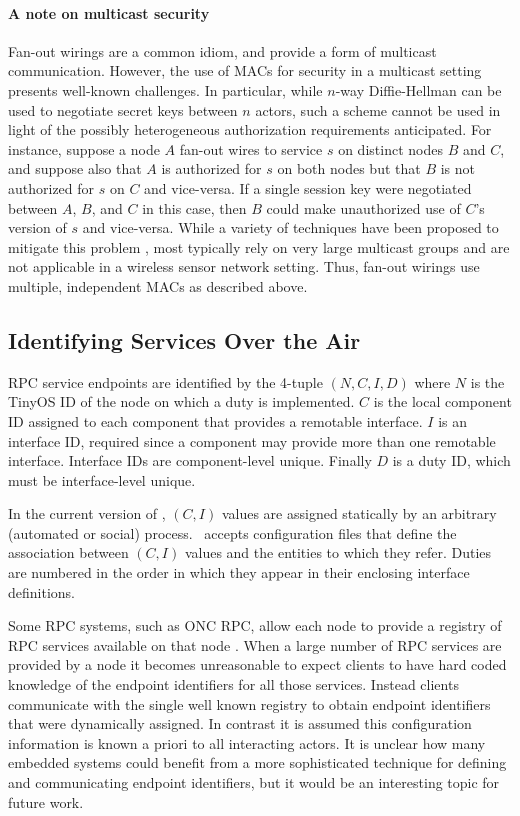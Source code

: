\paragraph{A note on multicast security} Fan-out wirings are a common idiom, and provide a form
of multicast communication. However, the use of MACs for security in a multicast setting
presents well-known challenges. In particular, while $n$-way Diffie-Hellman can be used to
negotiate secret keys between $n$ actors, such a scheme cannot be used in light of the possibly
heterogeneous authorization requirements anticipated. For instance, suppose a node $A$ fan-out
wires to service $s$ on distinct nodes $B$ and $C$, and suppose also that $A$ is authorized for
$s$ on both nodes but that $B$ is not authorized for $s$ on $C$ and vice-versa. If a single
session key were negotiated between $A$, $B$, and $C$ in this case, then $B$ could make
unauthorized use of $C$'s version of $s$ and vice-versa. While a variety of techniques have been
proposed to mitigate this problem \cite{canetti-1999}, most typically rely on very large
multicast groups and are not applicable in a wireless sensor network setting. Thus, fan-out wirings use
multiple, independent MACs as described above.

\subsection{Identifying Services Over the Air}

RPC service endpoints are identified by the 4-tuple $(N, C, I, D)$ where $N$ is the TinyOS ID of
the node on which a duty is implemented. $C$ is the local component ID assigned to each
component that provides a remotable interface. $I$ is an interface ID, required since a
component may provide more than one remotable interface. Interface IDs are component-level
unique. Finally $D$ is a duty ID, which must be interface-level unique.

In the current version of \Sprocket, $(C, I)$ values are assigned statically by an arbitrary
(automated or social) process. \Sprocket\ accepts configuration files that define the
association between $(C, I)$ values and the entities to which they refer. Duties are numbered in
the order in which they appear in their enclosing interface definitions.

Some RPC systems, such as ONC RPC, allow each node to provide a registry of RPC services
available on that node \cite{RFC-1833}. When a large number of RPC services are provided by a
node it becomes unreasonable to expect clients to have hard coded knowledge of the endpoint
identifiers for all those services. Instead clients communicate with the single well known
registry to obtain endpoint identifiers that were dynamically assigned. In contrast it is assumed
this configuration information is known a priori to all interacting actors. It is unclear how
many embedded systems could benefit from a more sophisticated technique for defining and
communicating endpoint identifiers, but it would be an interesting topic for future work.

